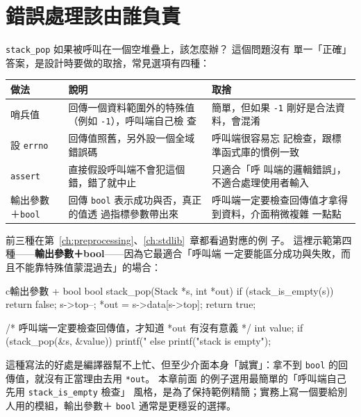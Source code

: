 \section{錯誤處理該由誰負責}
\label{sec:obj-errors}

\texttt{stack\_pop} 如果被呼叫在一個空堆疊上，該怎麼辦？ 這個問題沒有
單一「正確」答案，是設計時要做的取捨，常見選項有四種：

\begin{center}
\begin{tabular}{p{2.6cm}p{5.0cm}p{4.2cm}}
\toprule
做法 & 說明 & 取捨 \\
\midrule
哨兵值 & 回傳一個資料範圍外的特殊值（例如 \texttt{-1}），呼叫端自己檢
查 & 簡單，但如果 \texttt{-1} 剛好是合法資料，會混淆 \\
設 \texttt{errno} & 回傳值照舊，另外設一個全域錯誤碼 & 呼叫端很容易忘
記檢查，跟標準函式庫的慣例一致 \\
\texttt{assert} & 直接假設呼叫端不會犯這個錯，錯了就中止 & 只適合「呼
叫端的邏輯錯誤」，不適合處理使用者輸入 \\
輸出參數＋\texttt{bool} & 回傳 \texttt{bool} 表示成功與否，真正的值透
過指標參數帶出來 & 呼叫端一定要檢查回傳值才拿得到資料，介面稍微複雜
一點點 \\
\bottomrule
\end{tabular}
\end{center}

前三種在第~\ref{ch:preprocessing}、\ref{ch:stdlib}~章都看過對應的例
子。 這裡示範第四種——\textbf{輸出參數＋bool}——因為它最適合「呼叫端
一定要能區分成功與失敗，而且不能靠特殊值蒙混過去」的場合：

\begin{code}{c}{輸出參數 + bool}
bool stack_pop(Stack *s, int *out) {
    if (stack_is_empty(s)) return false;
    s->top--;
    *out = s->data[s->top];
    return true;
}

/* 呼叫端一定要檢查回傳值，才知道 *out 有沒有意義 */
int value;
if (stack_pop(&s, &value)) {
    printf("%
} else {
    printf("stack is empty\n");
}
\end{code}

這種寫法的好處是編譯器幫不上忙、但至少介面本身「誠實」：拿不到
\texttt{bool} 的回傳值，就沒有正當理由去用 \texttt{*out}。 本章前面
的例子選用最簡單的「呼叫端自己先用 \texttt{stack\_is\_empty} 檢查」
風格，是為了保持範例精簡；實務上寫一個要給別人用的模組，輸出參數＋
\texttt{bool} 通常是更穩妥的選擇。


